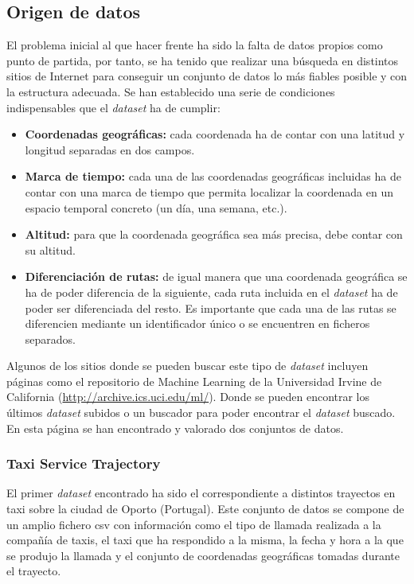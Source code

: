 \subsection{Origen de datos}
El problema inicial al que hacer frente ha sido la falta de datos propios como punto de partida, por tanto, se ha tenido que realizar una búsqueda en distintos sitios de Internet para conseguir un conjunto de datos lo más fiables posible y con la estructura adecuada. Se han establecido una serie de condiciones indispensables que el \textit{dataset} ha de cumplir:
\begin{itemize}
\item \textbf{Coordenadas geográficas:} cada coordenada ha de contar con una latitud y longitud separadas en dos campos.
\item \textbf{Marca de tiempo:} cada una de las coordenadas geográficas incluidas ha de contar con una marca de tiempo que permita localizar la coordenada en un espacio temporal concreto (un día, una semana, etc.).
\item \textbf{Altitud:} para que la coordenada geográfica sea más precisa, debe contar con su altitud.
\item \textbf{Diferenciación de rutas:} de igual manera que una coordenada geográfica se ha de poder diferencia de la siguiente, cada ruta incluida en el \textit{dataset} ha de poder ser diferenciada del resto. Es importante que cada una de las rutas se diferencien mediante un identificador único o se encuentren en ficheros separados.
\end{itemize}

Algunos de los sitios donde se pueden buscar este tipo de \textit{dataset} incluyen páginas como el repositorio de Machine Learning de la Universidad Irvine de California (\url{http://archive.ics.uci.edu/ml/}). Donde se pueden encontrar los últimos \textit{dataset} subidos o un buscador para poder encontrar el \textit{dataset} buscado. En esta página se han encontrado y valorado dos conjuntos de datos.

\subsubsection{Taxi Service Trajectory}
El primer \textit{dataset} encontrado ha sido el correspondiente a distintos trayectos en taxi sobre la ciudad de Oporto (Portugal). Este conjunto de datos se compone de un amplio fichero csv con información como el tipo de llamada realizada a la compañía de taxis, el taxi que ha respondido a la misma, la fecha y hora a la que se produjo la llamada y el conjunto de coordenadas geográficas tomadas durante el trayecto.

